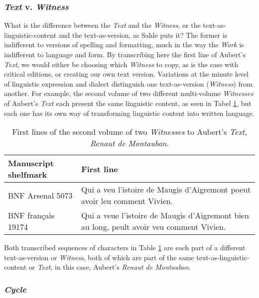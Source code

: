 \subsubsection{\textit{Text} v. \textit{Witness}}

What is the difference between the \textit{Text} and the \textit{Witness}, or the text-as-linguistic-content and the text-as-version, as Sahle puts it? The former is indifferent to versions of spelling and formatting, much in the way the \textit{Work} is indifferent to language and form. By transcribing here the first line of Aubert's \textit{Text}, we would either be choosing which \textit{Witness} to copy, as is the case with critical editions, or creating our own text version. Variations at the minute level of linguistic expression and dialect distinguish one text-as-version (\textit{Witness}) from another. For example, the second volume of two different multi-volume \textit{Witnesses} of Aubert's \textit{Text} each present the same linguistic content, as seen in Tabel \ref{tab:TextVersions}, but each one has its own way of transforming linguistic content into written language.

\begin{table}[ht]
    \begin{center}
        \begin{tabular}{|p{}|p{}|}
            \hline
            Manuscript shelfmark & First line \\
            \hline \hline
            BNF Arsenal 5073 & Qui a veu l'istoire de Maugis d'Aigremont poeut avoir leu comment Vivien. \\
            \hline
            BNF français 19174 & Qui a veue l'istoire de Maugis d'Aigremont bien au long, peult avoir veu comment Vivien.\\
            \hline
        \end{tabular}
    \end{center}
\caption{First lines of the second volume of two \textit{Witnesses} to Aubert's \textit{Text}, \textit{Renaut de Montauban}.}
\label{tab:TextVersions}
\end{table}

\noindent Both transcribed sequences of characters in Table \ref{tab:TextVersions} are each part of a different text-as-version or \textit{Witness}, both of which are part of the same text-as-linguistic-content or \textit{Text}, in this case, Aubert's \textit{Renaut de Montauban}.

\subsubsection{\textit{Cycle}}

